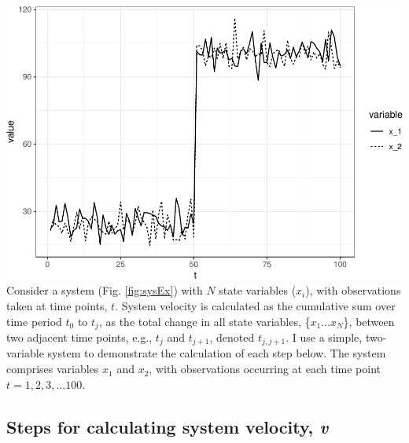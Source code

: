 \documentclass[12pt,twoside,openany]{reedthesis}
\begin{document}
\includegraphics{_myDissertation_files/figure-latex/sysEx-1.pdf}
Consider a system (Fig. \ref{fig:sysEx}) with \(N\) state variables (\(x_i\)), with observations taken at time points, \(t\). System velocity is calculated as the cumulative sum over time period \(t_0\) to \(t_j\), as the total change in all state variables, \{\(x_1 ...x_N\)\}, between two adjacent time points, e.g., \(t_j\) and \(t_{j+1}\), denoted \(t_{j,j+1}\). I use a simple, two-variable system to demonstrate the calculation of each step below. The system comprises variables \(x_1\) and \(x_2\), with observations occurring at each time point \(t = {1,2,3,...100}\).

\hypertarget{steps-for-calculating-system-velocity-v}{%
\subsection{\texorpdfstring{Steps for calculating system velocity, \emph{v}}{Steps for calculating system velocity, v}}\label{steps-for-calculating-system-velocity-v}}
\end{document}
